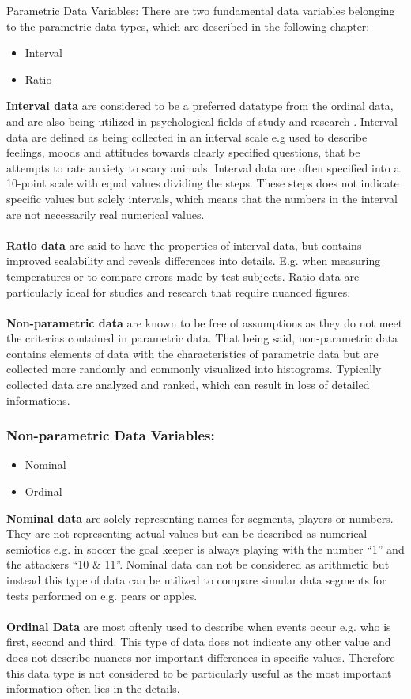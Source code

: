 Parametric Data Variables:
There are two fundamental data variables belonging to the parametric data types, which are described in the following chapter:
\begin{itemize}
\item Interval
\item Ratio 
\end{itemize}
\textbf{Interval data} are considered to be a preferred datatype from the ordinal data, and are also being utilized in psychological fields of study and research \citep[page 8]{Design}. Interval data are defined as being collected in an interval scale e.g used to describe feelings, moods and attitudes towards clearly specified questions, that be attempts to rate anxiety to scary animals. Interval data are often specified into a 10-point scale with equal values dividing the steps. These steps does not indicate specific values but solely intervals, which means that the numbers in the interval are not necessarily real numerical values.\\\\
\textbf{Ratio data} are said to have the properties of interval data, but contains improved scalability and reveals differences into details. E.g. when measuring temperatures or to compare errors made by test subjects. Ratio data are particularly ideal for studies and research that require nuanced figures.\\\\
\textbf{Non-parametric data} are known to be free of assumptions as they do not meet the criterias contained in parametric data. That being said, non-parametric data contains elements of data with the characteristics of parametric data but are collected more randomly and commonly visualized into histograms. Typically collected data are analyzed and ranked, which can result in loss of detailed informations. 
\subsubsection{Non-parametric Data Variables:}
\begin{itemize}
\item Nominal
\item Ordinal
\end{itemize}
\textbf{Nominal data} are solely representing names for segments, players or numbers. They are not representing actual values but can be described as numerical semiotics e.g. in soccer the goal keeper is always playing with the number “1” and the attackers “10 \& 11”. Nominal data can not be considered as arithmetic but instead this type of data can be utilized to compare simular data segments for tests performed on e.g. pears or apples.\\\\
\textbf{Ordinal Data} are most oftenly used to describe when events occur e.g. who is first, second and third. This type of data does not indicate any other value and does not describe nuances nor important differences in specific values. Therefore this data type is not considered to be particularly useful as the most important information often lies in the details. 
